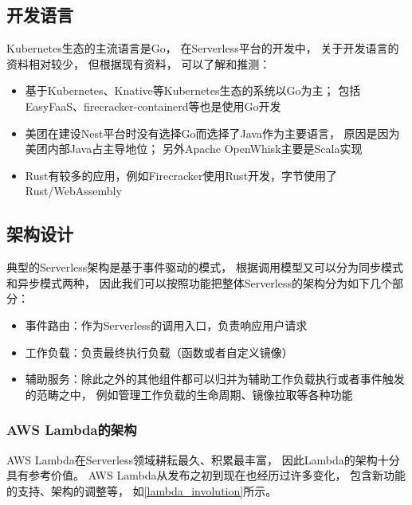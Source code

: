 

\subsection{开发语言}
Kubernetes生态的主流语言是Go，
在Serverless平台的开发中，
关于开发语言的资料相对较少，
但根据现有资料，
可以了解和推测：

\begin{itemize}
    \item 基于Kubernetes、Knative等Kubernetes生态的系统以Go为主；
    包括EasyFaaS、firecracker-containerd等也是使用Go开发
    \item 美团在建设Nest平台时没有选择Go而选择了Java作为主要语言，
    原因是因为美团内部Java占主导地位\cite{meituan_serverless_nest}；
    另外Apache OpenWhisk主要是Scala实现
    \item Rust有较多的应用，例如Firecracker使用Rust开发，字节使用了Rust/WebAssembly\cite{bytedance_faas}
\end{itemize}

\subsection{架构设计}
典型的Serverless架构是基于事件驱动的模式，
根据调用模型又可以分为同步模式和异步模式两种，
因此我们可以按照功能把整体Serverless的架构分为如下几个部分：

\begin{itemize}
    \item 事件路由：作为Serverless的调用入口，负责响应用户请求
    \item 工作负载：负责最终执行负载（函数或者自定义镜像）
    \item 辅助服务：除此之外的其他组件都可以归并为辅助工作负载执行或者事件触发的范畴之中，
    例如管理工作负载的生命周期、镜像拉取等各种功能
\end{itemize}

\subsubsection{AWS Lambda的架构}
AWS Lambda在Serverless领域耕耘最久、积累最丰富，
因此Lambda的架构十分具有参考价值。
AWS Lambda从发布之初到现在也经历过许多变化，
包含新功能的支持、架构的调整等，
如\cref{lambda_involution}所示。

